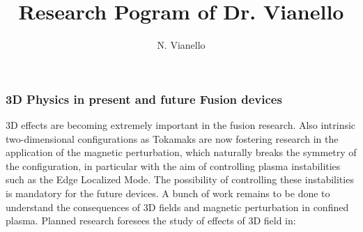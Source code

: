 \documentclass[12pt,a4paper]{article}
\title{Research Pogram of Dr. Vianello}
\author{%
   \vspace{10pt}
	N. Vianello\\
	\vspace{20pt}
	}
\makeatletter
\def\printtitle{%
    {\color{bl} \centering \huge \sc \textbf{\@title}\par}}		%
\def\printauthor{%
    {\centering \small \@author}}				%
\makeatother
\begin{document}
\printtitle 

\printauthor
\subsubsection*{3D Physics in present and future Fusion devices}
3D effects are becoming extremely important in the fusion research. 
Also intrinsic two-dimensional configurations as Tokamaks are now
fostering research 
in the application of the magnetic perturbation, which naturally breaks
the symmetry of the configuration, 
in particular with the aim of controlling plasma instabilities such as
the Edge Localized Mode. 
The possibility of controlling these instabilities is mandatory for
the future devices. 
A bunch of work remains to be done to understand the consequences of
3D fields 
and magnetic perturbation in confined plasma. 
Planned research foresees the study of effects of 3D field in:
\end{document}
